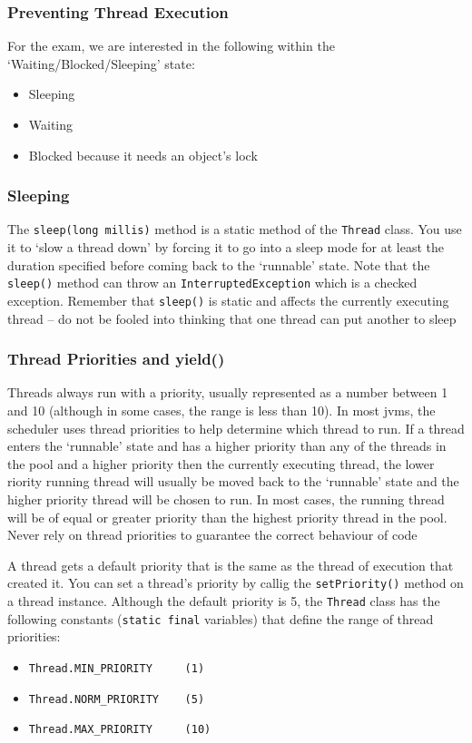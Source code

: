 \subsubsection{Preventing Thread Execution}
For the exam, we are interested in the following within the 
`Waiting/Blocked/Sleeping' state:
\begin{itemize}
    \item Sleeping
    \item Waiting
    \item Blocked because it needs an object's lock
\end{itemize}
\subsubsection{Sleeping}
The \verb#sleep(long millis)# method is a static method of the \verb#Thread# 
class. You use it to `slow a thread down' by forcing it to go into a sleep mode 
for at least the duration specified before coming back to the `runnable' state.  
Note that the \verb#sleep()# method can throw an \verb#InterruptedException# 
which is a checked exception. Remember that \verb#sleep()# is static and 
affects the currently executing thread -- do not be fooled into thinking that 
one thread can put another to sleep

\subsubsection{Thread Priorities and yield()}
Threads always run with a priority, usually represented as a number between 1 
and 10 (although in some cases, the range is less than 10). In most jvms, the 
scheduler uses thread priorities to help determine which thread to run. If a 
thread enters the `runnable' state and has a higher priority than any of the 
threads in the pool and a higher priority then the currently executing thread, 
the lower riority running thread will usually be moved back to the `runnable' 
state and the higher priority thread will be chosen to run. In most cases, the 
running thread will be of equal or greater priority than the highest priority 
thread in the pool. Never rely on thread priorities to guarantee the correct 
behaviour of code

A thread gets a default priority that is the same as the thread of execution 
that created it. You can set a thread's priority by callig the 
\verb#setPriority()# method on a thread instance. Although the default priority 
is 5, the \verb#Thread# class has the following constants (\verb#static final# 
variables) that define the range of thread priorities:
\begin{itemize}
    \item \verb#Thread.MIN_PRIORITY     (1)#
    \item \verb#Thread.NORM_PRIORITY    (5)#
    \item \verb#Thread.MAX_PRIORITY     (10)#
\end{itemize}

